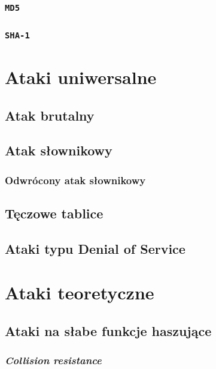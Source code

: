 \documentclass[12pt,a4paper,twoside]{article}
\begin{document}
\subsubsection{\texttt{MD5}}

\subsubsection{\texttt{SHA-1}}

\newpage
\section{Ataki uniwersalne}
\label{sec:universal_attacks}

\subsection{Atak brutalny}

\subsection{Atak słownikowy}

\subsubsection{Odwrócony atak słownikowy}

\subsection{Tęczowe tablice}

\subsection{Ataki typu Denial of Service}

\section{Ataki teoretyczne}

\subsection{Ataki na słabe funkcje haszujące}

\subsubsection{\textit{Collision resistance}}
\end{document}
